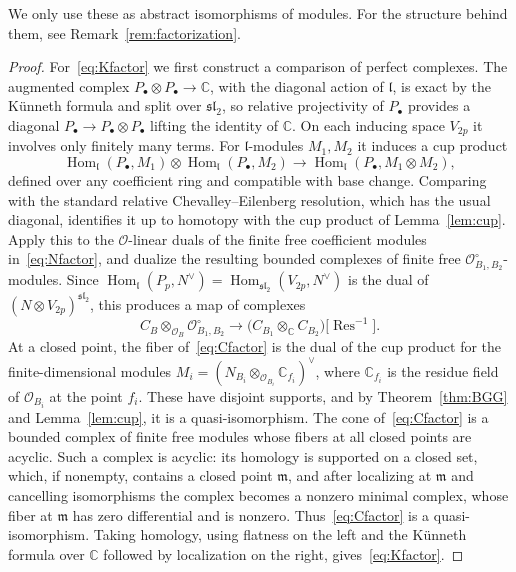 \documentclass[11pt]{amsart}
\numberwithin{equation}{section}
\theoremstyle{definition}
\theoremstyle{remark}
\newcommand{\C}{\mathbb{C}}
\newcommand{\sltwo}{\mathfrak{sl}_2}
\newcommand{\lie}{\mathfrak{l}}
\newcommand{\cO}{\mathcal{O}}
\newcommand{\Res}{\operatorname{Res}}
\newcommand{\Hom}{\operatorname{Hom}}
\begin{document}
We only use these as abstract isomorphisms of modules. For the structure behind them, see Remark~\ref{rem:factorization}.

\begin{proof}
For~\eqref{eq:Kfactor} we first construct a comparison of perfect complexes. The augmented complex $P_\bullet\otimes P_\bullet\to\C$, with the diagonal action of $\lie$, is exact by the K\"unneth formula and split over $\sltwo$, so relative projectivity of $P_\bullet$ provides a diagonal $P_\bullet\to P_\bullet\otimes P_\bullet$ lifting the identity of $\C$. On each inducing space $V_{2p}$ it involves only finitely many terms. For $\lie$-modules $M_1,M_2$ it induces a cup product
\begin{equation}\label{eq:cup-P}
\Hom_\lie(P_\bullet,M_1)\otimes\Hom_\lie(P_\bullet,M_2)\longrightarrow\Hom_\lie(P_\bullet,M_1\otimes M_2),
\end{equation}
defined over any coefficient ring and compatible with base change. Comparing with the standard relative Chevalley--Eilenberg resolution, which has the usual diagonal, identifies it up to homotopy with the cup product of Lemma~\ref{lem:cup}. Apply this to the $\cO$-linear duals of the finite free coefficient modules in~\eqref{eq:Nfactor}, and dualize the resulting bounded complexes of finite free $\cO^\circ_{B_1,B_2}$-modules. Since $\Hom_\lie(P_p,N^\vee)=\Hom_{\sltwo}(V_{2p},N^\vee)$ is the dual of $(N\otimes V_{2p})^{\sltwo}$, this produces a map of complexes
\begin{equation}\label{eq:Cfactor}
C_B\otimes_{\cO_B}\cO^\circ_{B_1,B_2}\longrightarrow\bigl(C_{B_1}\otimes_\C C_{B_2}\bigr)\bigl[\Res^{-1}\bigr].
\end{equation}
At a closed point, the fiber of~\eqref{eq:Cfactor} is the dual of the cup product for the finite-dimensional modules $M_i=(N_{B_i}\otimes_{\cO_{B_i}}\C_{f_i})^\vee$, where $\C_{f_i}$ is the residue field of $\cO_{B_i}$ at the point $f_i$. These have disjoint supports, and by Theorem~\ref{thm:BGG} and Lemma~\ref{lem:cup}, it is a quasi-isomorphism. The cone of~\eqref{eq:Cfactor} is a bounded complex of finite free modules whose fibers at all closed points are acyclic. Such a complex is acyclic: its homology is supported on a closed set, which, if nonempty, contains a closed point $\mathfrak m$, and after localizing at $\mathfrak m$ and cancelling isomorphisms the complex becomes a nonzero minimal complex, whose fiber at $\mathfrak m$ has zero differential and is nonzero. Thus~\eqref{eq:Cfactor} is a quasi-isomorphism. Taking homology, using flatness on the left and the K\"unneth formula over $\C$ followed by localization on the right, gives~\eqref{eq:Kfactor}.


\end{proof}
\end{document}

